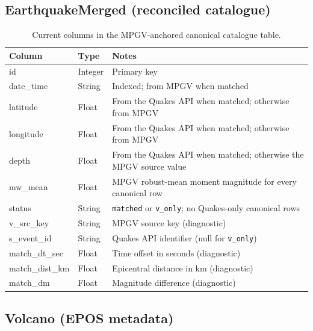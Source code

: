 \documentclass[12pt]{article}
\begin{document}
\subsection*{EarthquakeMerged (reconciled catalogue)}

\begin{table}[H]
\centering
\caption{Current columns in the MPGV-anchored canonical catalogue table.}
\footnotesize
\setlength{\tabcolsep}{3pt}
\begin{tabular}{>{\raggedright\arraybackslash}p{3.1cm}>{\raggedright\arraybackslash}p{2.0cm}>{\raggedright\arraybackslash}p{8.6cm}}
\hline
\textbf{Column} & \textbf{Type} & \textbf{Notes} \\
\hline
id             & Integer & Primary key \\
date\_time     & String  & Indexed; from MPGV when matched \\
latitude       & Float   & From the Quakes API when matched; otherwise from MPGV \\
longitude      & Float   & From the Quakes API when matched; otherwise from MPGV \\
depth          & Float   & From the Quakes API when matched; otherwise the MPGV source value \\
mw\_mean       & Float   & MPGV robust-mean moment magnitude for every canonical row \\
status         & String  & \texttt{matched} or \texttt{v\_only}; no Quakes-only canonical rows \\
v\_src\_key    & String  & MPGV source key (diagnostic) \\
s\_event\_id   & String  & Quakes API identifier (null for \texttt{v\_only}) \\
match\_dt\_sec & Float   & Time offset in seconds (diagnostic) \\
match\_dist\_km & Float  & Epicentral distance in km (diagnostic) \\
match\_dm      & Float   & Magnitude difference (diagnostic) \\
\hline
\end{tabular}
\end{table}

\subsection*{Volcano (EPOS metadata)}
\end{document}
